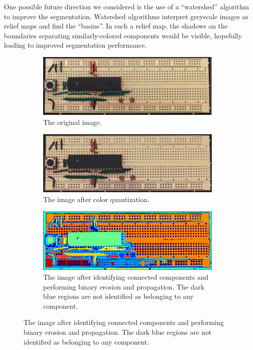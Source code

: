 \documentclass[10pt,twocolumn,letterpaper]{article}
\begin{document}
One possible future direction we considered is the use of a
``watershed'' algorithm to improve the segmentation. Watershed
algorithms interpret greyscale images as relief maps and find the
``basins''. In such a relief map, the shadows on the boundaries
separating similarly-colored components would be visible, hopefully
leading to improved segmentation performance.

\begin{figure}[ht]
\centering
\begin{subfigure}[b]{\linewidth}
	\centering
   \includegraphics[width=0.9\linewidth]{demos/original_of_comp.png}
	\caption{The original image.}
	\label{fig:segment-orig}
\end{subfigure}
\begin{subfigure}[b]{\linewidth}
	\centering
   \includegraphics[width=0.9\linewidth]{demos/quantized_img2.png}
	\caption{The image after color quantization.}
	\label{fig:segment-quantized}
\end{subfigure}
\begin{subfigure}[b]{\linewidth}
	\centering
   \includegraphics[width=0.9\linewidth]{demos/connectedcomponents_jet_img2.png}
	\caption{The image after identifying connected components and
      performing binary erosion and propagation. The dark blue regions
      are not identified as belonging to any component.}
	\label{fig:segment-connected}
\end{subfigure}
\end{figure}
\end{document}
